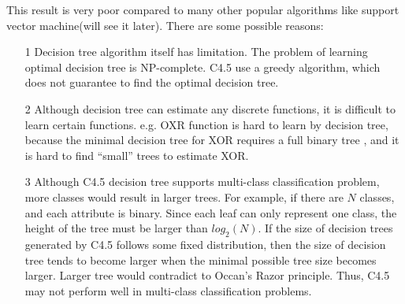 \documentclass[a4paper,11pt]{article}
\begin{document}
This result is very poor compared to many other popular algorithms like support vector machine(will see it later). There are some possible reasons:\\
\begin{enumerate}
\item[1] Decision tree algorithm itself has limitation. The problem of learning optimal decision tree is NP-complete\cite{DT_NPC}. C4.5 use a greedy algorithm, which does not guarantee to find the optimal decision tree.
\item[2] Although decision tree can estimate any discrete functions, it is difficult to learn certain functions. e.g. OXR function is hard to learn by decision tree, because the minimal decision tree for XOR requires a full binary tree , and it is hard to find ``small'' trees to estimate XOR.
\item[3] Although C4.5 decision tree supports multi-class classification problem, more classes would result in larger trees. For example, if there are $N$ classes, and each attribute is binary. Since each leaf can only represent one class, the height of the tree must be larger than $log_2(N)$. If the size of decision trees generated by C4.5 follows some fixed distribution, then the size of decision tree tends to become larger when the minimal possible tree size becomes larger. Larger tree would contradict to Occan's Razor principle. Thus, C4.5 may not perform well in multi-class classification problems.
\end{enumerate}
\end{document}
